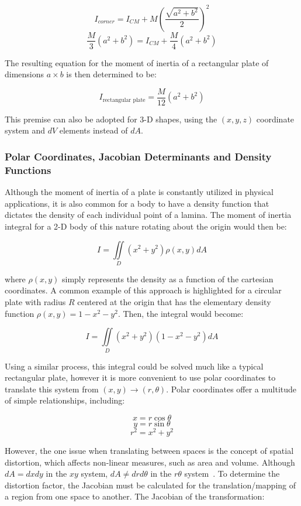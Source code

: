 \[I_{corner} = I_{CM} + M\left(\frac{\sqrt{a^2+b^2}}{2}\right)^2\]
\[\frac{M}{3}\left(a^2+b^2\right) = I_{CM} + \frac{M}{4}\left(a^2+b^2\right)\]

The resulting equation for the moment of inertia of a rectangular plate of dimensions $a \times b$ is then determined to be:

\begin{equation}
I_{\text{rectangular plate}} = \frac{M}{12}\left(a^2+b^2\right)
\label{eq:final_moment_rectangular_plate}
\end{equation}

This premise can also be adopted for 3-D shapes, using the $(x,y,z)$ coordinate system and $dV$ elements instead of $dA$.

\subsubsection{Polar Coordinates, Jacobian Determinants and Density Functions}

Although the moment of inertia of a plate is constantly utilized in physical applications, it is also common for a body to have a density function that dictates the density of each individual point of a lamina. The moment of inertia integral for a 2-D body of this nature rotating about the origin would then be:

\[I = \iint\limits_{D} (x^2+y^2)\rho(x,y) dA\]

where $\rho(x,y)$ simply represents the density as a function of the cartesian coordinates. A common example of this approach is highlighted for a circular plate with radius $R$ centered at the origin that has the elementary density function $\rho(x,y) = 1 - x^2 - y^2$. Then, the integral would become:

\[I = \iint\limits_{D} (x^2+y^2)(1 - x^2 - y^2) dA\]

Using a similar process, this integral could be solved much like a typical rectangular plate, however it is more convenient to use polar coordinates to translate this system from $(x,y) \rightarrow (r, \theta)$. Polar coordinates offer a multitude of simple relationships, including:

\[x = r\cos\theta\]
\[y = r\sin\theta\]
\[r^2 = x^2 + y^2\]

However, the one issue when translating between spaces is the concept of spatial distortion, which affects non-linear measures, such as area and volume. Although $dA = dxdy$ in the $xy$ system, $dA \neq drd\theta$ in the $r \theta$ system~\parencite{Hass_Heil_Weir_2018}. To determine the distortion factor, the Jacobian must be calculated for the translation/mapping of a region from one space to another. The Jacobian of the transformation:

